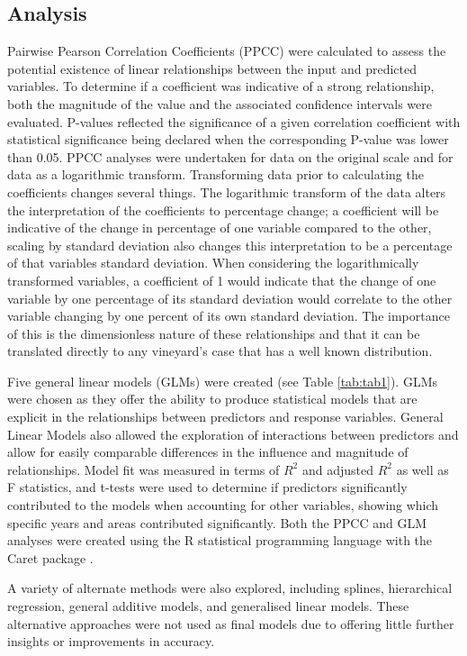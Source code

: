 \documentclass[review,12pt,authoryear]{elsarticle}
\begin{document}
\begin{linenumbers}
\subsection{Analysis}
Pairwise Pearson Correlation Coefficients (PPCC) were calculated to assess the potential existence of linear relationships between the input and predicted variables. To determine if a coefficient was indicative of a strong relationship, both the magnitude of the value and the associated confidence intervals were evaluated. P-values reflected the significance of a given correlation coefficient with statistical significance being declared when the corresponding P-value was lower than 0.05. PPCC analyses were undertaken for data on the original scale and for data as a logarithmic transform. Transforming data prior to calculating the coefficients changes several things. The logarithmic transform of the data alters the interpretation of the coefficients to percentage change; a coefficient will be indicative of the change in percentage of one variable compared to the other, scaling by standard deviation also changes this interpretation to be a percentage of that variables standard deviation. When considering the logarithmically transformed variables, a coefficient of 1 would indicate that the change of one variable by one percentage of its standard deviation would correlate to the other variable changing by one percent of its own standard deviation. The importance of this is the dimensionless nature of these relationships and that it can be translated directly to any vineyard's case that has a well known distribution.
\par
Five general linear models (GLMs) were created (see Table \ref{tab:tab1}). GLMs were chosen as they offer the ability to produce statistical models that are explicit in the relationships between predictors and response variables.  General Linear Models also allowed the exploration of interactions between predictors and allow for easily comparable differences in the influence and magnitude of relationships. Model fit was measured in terms of $R^2$ and adjusted $R^2$ as well as F statistics, and t-tests were used to determine if predictors significantly contributed to the models when accounting for other variables, showing which specific years and areas contributed significantly. Both the PPCC and GLM analyses were created using the R statistical programming language \citep{rcoreteamLanguageEnvironmentStatistical2021} with the Caret package \citep{kuhnBuildingPredictiveModels2008}. 
\par
A variety of alternate methods were also explored, including splines, hierarchical regression, general additive models, and generalised linear models. These alternative approaches were not used as final models due to offering little further insights or improvements in accuracy.
\par

\end{linenumbers}
\end{document}
